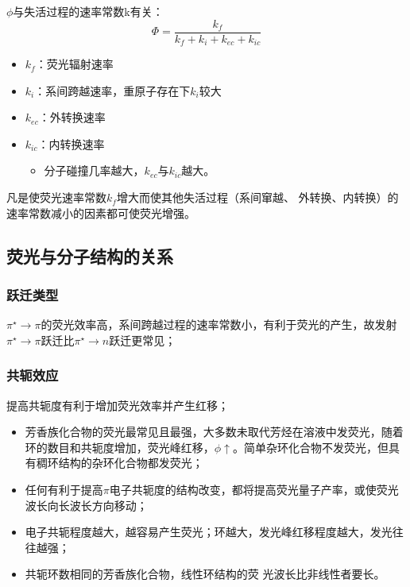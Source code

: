 $\phi$与失活过程的速率常数k有关：
\begin{equation}
	\Phi =\frac{k_{f}}{k_{f}+k_{i}+k_{ec}+k_{ic}}
\end{equation}
\begin{note}
	\begin{itemize}
		\item $k_{f}$：荧光辐射速率
		\item $k_{i}$：系间跨越速率，重原子存在下$k_{i}$较大
		\item $k_{ec}$：外转换速率
		\item $k_{ic}$：内转换速率
		\begin{itemize}
			\item 分子碰撞几率越大，$k_{ec}$与$k_{ic}$越大。
		\end{itemize}
	\end{itemize}
\end{note}
凡是使荧光速率常数$k_{f}$增大而使其他失活过程（系间窜越、 外转换、内转换）的速率常数减小的因素都可使荧光增强。

\subsection{荧光与分子结构的关系}
\subsubsection{跃迁类型}
$\pi^{\star} \rightarrow \pi$的荧光效率高，系间跨越过程的速率常数小，有利于荧光的产生，故发射 $\pi^{\star} \rightarrow \pi$跃迁比$\pi^{\star} \rightarrow n$跃迁更常见；

\subsubsection{共轭效应}
提高共轭度有利于增加荧光效率并产生红移；
\begin{itemize}
	\item 芳香族化合物的荧光最常见且最强，大多数未取代芳烃在溶液中发荧光，随着环的数目和共轭度增加，荧光峰红移，$\phi \uparrow$。简单杂环化合物不发荧光，但具有稠环结构的杂环化合物都发荧光；
	\item 任何有利于提高$\pi$电子共轭度的结构改变，都将提高荧光量子产率，或使荧光波长向长波长方向移动；
	\item 电子共轭程度越大，越容易产生荧光；环越大，发光峰红移程度越大，发光往往越强；
	\item 共轭环数相同的芳香族化合物，线性环结构的荧 光波长比非线性者要长。
\end{itemize}

